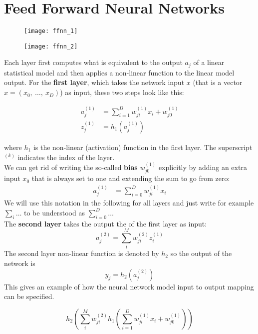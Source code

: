 \chapter{Feed Forward Neural Networks}

\begin{figure}[H]
	\centering
	\texttt{[image: ffnn\_1]}
	\caption{}
	\label{fig:ffnn1}
\end{figure}

\begin{figure}[H]
	\centering
	\texttt{[image: ffnn\_2]}
	\caption{}
	\label{fig:ffnn2}
\end{figure}

Each layer first computes what is equivalent to the output $a_j$ of a linear statistical model and then applies a non-linear function to the linear model output. For the \textbf{first layer}, which takes the network input $x$ (that is a vector $x = (x_0,\ \dots,\ x_D)$) as input, these two steps look like this:

$$
\begin{aligned}
	a^{(1)}_j & = \sum_{i=1}^D w^{(1)}_{ji} x_i + w^{(1)}_{j0} \\
	z^{(1)}_j & = h_1(a^{(1)}_j )
\end{aligned}
$$

where $h_1$ is the non-linear (activation) function in the first layer. The superscript ${}^{(k)}$ indicates the index of the layer. \\
We can get rid of writing the so-called \textbf{bias} $w^{(1)}_{j0}$ explicitly by adding an extra input $x_0$ that is always set to one and extending the sum to go from zero:
$$
\begin{aligned}
	a^{(1)}_j & = \sum_{i=0}^D w^{(1)}_{ji} x_i 
\end{aligned}
$$
We will use this notation in the following for all layers and just write for example $\sum_i \ldots$ to be understood as $\sum_{i=0}^D \ldots$\\

The \textbf{second layer} takes the output the of the first layer as input:  
$$
a^{(2)}_j = \sum_{i}^M w^{(2)}_{ji} z^{(1)}_i 
$$
The second layer non-linear function is denoted by $h_2$ so the output of the network is
$$
y_j = h_2(a^{(2)}_j)
$$
This gives an example of how the neural network model input to output mapping can be specified. 

$$
h_2\left( \sum_{i}^M w^{(2)}_{ji} h_1 \left( \sum_{i=1}^D w^{(1)}_{ji} x_i + w^{(1)}_{j0} \right) \right)
$$